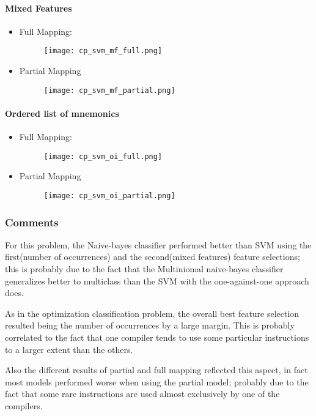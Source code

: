 \documentclass[a4paper]{article}
\begin{document}
\newpage
\paragraph{Mixed Features}
\begin{itemize}
\item Full Mapping:
\begin{figure} [h!]
  \texttt{[image: cp\_svm\_mf\_full.png]}
\end{figure}
\item Partial Mapping
\begin{figure} [h!]
  \texttt{[image: cp\_svm\_mf\_partial.png]}
\end{figure}
\end{itemize}

\paragraph{Ordered list of mnemonics}
\begin{itemize}
\item Full Mapping:
\begin{figure} [h!]
  \texttt{[image: cp\_svm\_oi\_full.png]}
\end{figure}
\item Partial Mapping
\begin{figure} [h!]
  \texttt{[image: cp\_svm\_oi\_partial.png]}
\end{figure}
\end{itemize}

\newpage
\subsubsection{Comments}
For this problem, the Naive-bayes classifier performed better than SVM using the first(number of occurrences) and the second(mixed features) feature selections; this is probably due to the fact that the Multiniomal naive-bayes classifier generalizes better to multiclass than the SVM with the one-against-one approach does. 

As in the optimization classification problem, the overall best feature selection resulted being the number of occurrences by a large margin. This is probably correlated to the fact that one compiler tends to use some particular instructions to a larger extent than the others.

Also the different results of partial and full mapping reflected this aspect, in fact most models performed worse when using the partial model; probably due to the fact that some rare instructions are used almost exclusively by one of the compilers.
\end{document}
